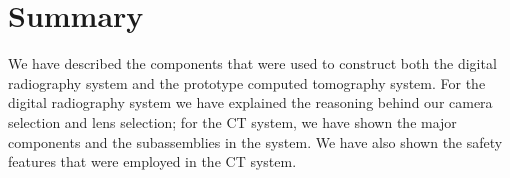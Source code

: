 
\section{Summary}
We have described the components that were used to construct both the digital radiography system and the prototype computed tomography system.  For the digital radiography system we have explained the reasoning behind our camera selection and lens selection; for the CT system, we have shown the major components and the subassemblies in the system.  We have also shown the safety features that were employed in the CT system.  